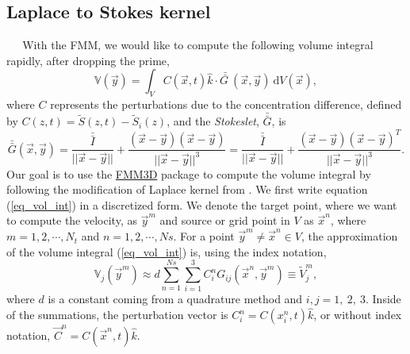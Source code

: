 \subsection{Laplace to Stokes kernel}
$\ \ \ \ \ $  
With the FMM, we would like to compute the following volume integral rapidly, after dropping the prime,  
\begin{equation}
\mathbb{V}(\vec{y}) = 
 \int_{V} 
	C (\vec{x},t ) \hat{k} \cdot 
	\bar{\bar{G \ }} (\vec{x}, \vec{y} ) 
	\ \text{d}V(\vec{x}),
	\label{eq_vol_int}
\end{equation}
where $C$ represents the perturbations due to the concentration difference, defined by $C(z,t) = \tilde{S}(z,t) - \tilde{S}_i(z)$,
and the {\it{Stokeslet}}, $ \bar{\bar{G}}$, is
\begin{equation}
    \bar{\bar{G}}(\vec{x},\vec{y}) =   
    \frac{\bar{\bar{I}}}{||\vec{x}-\vec{y}||} + \frac{(\vec{x}-\vec{y})(\vec{x}-\vec{y})}{||\vec{x}-\vec{y} ||^3}
	 =   
	    \frac{\bar{\bar{I}}}{||\vec{x}-\vec{y}||} + \frac{(\vec{x}-\vec{y})(\vec{x}-\vec{y})^T}{||\vec{x}-\vec{y}||^3}.
\end{equation}
Our goal is to use the \href{https://github.com/flatironinstitute/FMM3D}{FMM3D} package to compute the volume integral by following the modification of Laplace kernel from \cite{tornberg_fast_2008}.
We first write equation (\ref{eq_vol_int}) in a discretized form. We denote the target point, where we want to compute the velocity, as $\vec{y}^m$ and source or grid point in $V$ as $\vec{x}^n$, where $m = 1,2, \cdots, N_t$ and $n = 1,2, \cdots, Ns$.
For a point $\vec{y}^m \neq \vec{x}^n \in V$, the approximation of the volume integral (\ref{eq_vol_int}) is, using the index notation, 
\begin{equation}
	\mathbb{V}_{j}(\vec{y}^m) 
	\approx d\sum_{n = 1}^{Ns} \sum_{i = 1}^{3}
	C^n_{i} G_{ij}(\vec{x}^n,\vec{y}^m)
	\equiv \tilde{V}_j^m,
	\label{eq_Vn}
\end{equation}
where $d$ is a constant coming from a quadrature method and $i,j = 1,\ 2,\ 3.$ 
Inside of the summations, the perturbation vector is 
 $C_i^n = C(x^n_i,  t)\hat{k}$, or without index notation, $ \vec{C}^n= C(\vec{x}^n, t) \hat{k}$. 
